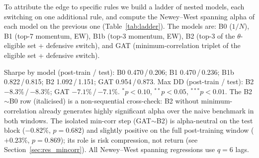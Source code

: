 To attribute the edge to specific rules we build a ladder of nested models, each
switching on one additional rule, and compute the Newey--West spanning alpha of
each model on the previous one (Table~\ref{tab:ladder}). The models are: B0
($1/N$), B1 (top-7 momentum, EW), B1b (top-3 momentum, EW), B2 (top-3 of the
$\theta$-eligible set + defensive switch), and GAT (minimum-correlation triplet of
the eligible set + defensive switch).

\begin{table}[H]
\centering
\caption{Nested incremental spanning alpha by rule}
\label{tab:ladder}
\small
\setlength{\tabcolsep}{5pt}
\begin{flushleft}
\footnotesize
Sharpe by model (post-train / test): B0 0.470\,/\,0.206; B1 0.470\,/\,0.236;
B1b 0.822\,/\,0.815; B2 1.092\,/\,1.151; GAT 0.954\,/\,0.873.
Max DD (post-train / test): B2 $-8.3\%$\,/\,$-8.3\%$; GAT $-7.1\%$\,/\,$-7.1\%$.
$^{*}p<0.10$, $^{**}p<0.05$, $^{***}p<0.01$.
The B2$\sim$B0 row (italicised) is a non-sequential cross-check: B2 without
minimum-correlation already generates highly significant alpha over the naive benchmark
in both windows. The isolated min-corr step (GAT$\sim$B2) is alpha-neutral on the
test block ($-0.82\%$, $p = 0.682$) and slightly positive on the full post-training
window ($+0.23\%$, $p = 0.869$); its role is risk compression, not return (see
Section~\ref{sec:res_mincorr}). All Newey--West spanning regressions use $q=6$ lags.
\end{flushleft}
\end{table}

